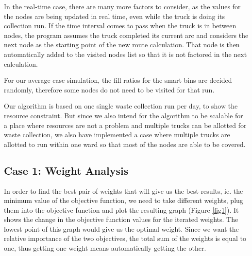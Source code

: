 \documentclass[12pt]{article}
\begin{document}
In the real-time case, there are many more factors to consider, as the values for the nodes are being updated in real time, even while the truck is doing its collection run. If the time interval comes to pass when the truck is in between nodes, the program assumes the truck completed its current arc and considers the next node as the starting point of the new route calculation. That node is then automatically added to the visited nodes list so that it is not factored in the next calculation.

For our average case simulation, the fill ratios for the smart bins are decided randomly, therefore some nodes do not need to be visited for that run.

Our algorithm is based on one single waste collection run per day, to show the resource constraint. But since we also intend for the algorithm to be scalable for a place where resources are not a problem and multiple trucks can be allotted for waste collection, we also have implemented a case where multiple trucks are allotted to run within one ward so that most of the nodes are able to be covered.

\subsection*{Case 1: Weight Analysis}
In order to find the best pair of weights that will give us the best results, ie. the minimum value of the objective function, we need to take different weights, plug them into the objective function and plot the resulting graph (Figure \ref{fig1}). It shows the change in the objective function values for the iterated weights. The lowest point of this graph would give us the optimal weight. Since we want the relative importance of the two objectives, the total sum of the weights is equal to one, thus getting one weight means automatically getting the other.
\end{document}
